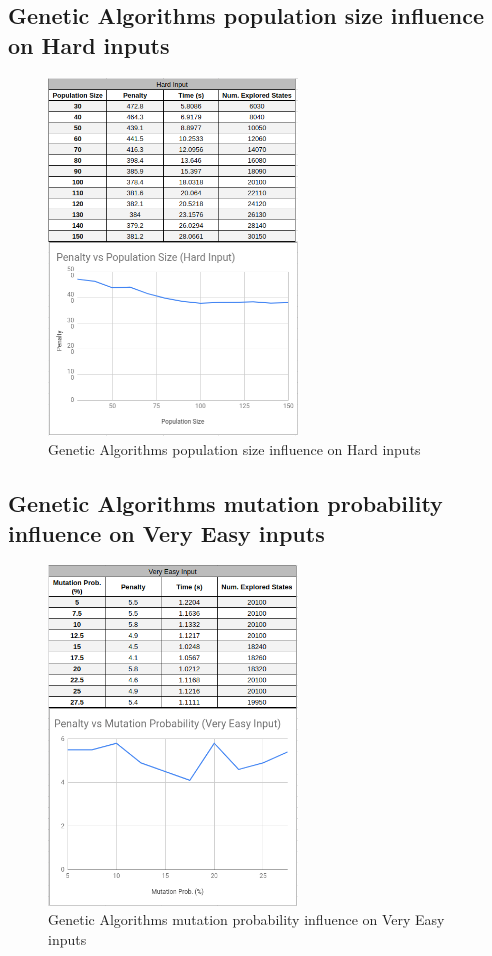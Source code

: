 \documentclass[conference]{IEEEtran}
\begin{document}
\subsection{Genetic Algorithms population size influence on Hard inputs}

\begin{figure}[H]
    \centerline{\includegraphics[width=250px]{genetic_pop_size_hard.png}}
    \caption{Genetic Algorithms population size influence on Hard inputs}
\end{figure}

\subsection{Genetic Algorithms mutation probability influence on Very Easy inputs}

\begin{figure}[H]
    \centerline{\includegraphics[width=250px]{mutation_prob_very_easy.png}}
    \caption{Genetic Algorithms mutation probability influence on Very Easy inputs}
\end{figure}
\end{document}
